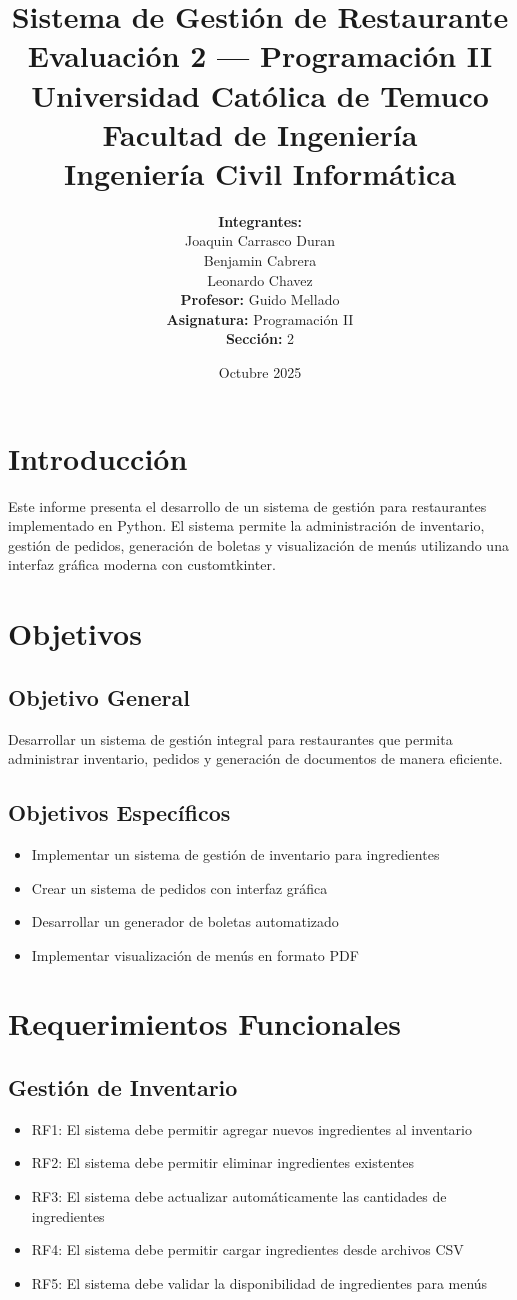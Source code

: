 \documentclass[12pt,letterpaper]{article}
\title{\textbf{Sistema de Gestión de Restaurante}\\
\large Evaluación 2 --- Programación II\\
\vspace{0.5cm}
\normalsize Universidad Católica de Temuco\\
\normalsize Facultad de Ingeniería\\
\normalsize Ingeniería Civil Informática}
\author{
    \textbf{Integrantes:}\\
    \vspace{0.3cm}
    Joaquin Carrasco Duran\\
    \vspace{0.3cm}
    Benjamin Cabrera\\
    \vspace{0.3cm}
    Leonardo Chavez\\
    \vspace{0.3cm}
    \textbf{Profesor:} Guido Mellado\\
    \vspace{0.3cm}
    \textbf{Asignatura:} Programación II\\
    \vspace{0.3cm}
    \textbf{Sección:} 2
}
\date{Octubre 2025}
\begin{document}
\maketitle
\newpage
\tableofcontents
\newpage

\section{Introducción}
Este informe presenta el desarrollo de un sistema de gestión para restaurantes implementado en Python. El sistema permite la administración de inventario, gestión de pedidos, generación de boletas y visualización de menús utilizando una interfaz gráfica moderna con customtkinter.

\section{Objetivos}
\subsection{Objetivo General}
Desarrollar un sistema de gestión integral para restaurantes que permita administrar inventario, pedidos y generación de documentos de manera eficiente.

\subsection{Objetivos Específicos}
\begin{itemize}
    \item Implementar un sistema de gestión de inventario para ingredientes
    \item Crear un sistema de pedidos con interfaz gráfica
    \item Desarrollar un generador de boletas automatizado
    \item Implementar visualización de menús en formato PDF
\end{itemize}

\section{Requerimientos Funcionales}

\subsection{Gestión de Inventario}
\begin{itemize}
    \item RF1: El sistema debe permitir agregar nuevos ingredientes al inventario
    \item RF2: El sistema debe permitir eliminar ingredientes existentes
    \item RF3: El sistema debe actualizar automáticamente las cantidades de ingredientes
    \item RF4: El sistema debe permitir cargar ingredientes desde archivos CSV
    \item RF5: El sistema debe validar la disponibilidad de ingredientes para menús
\end{itemize}
\end{document}
